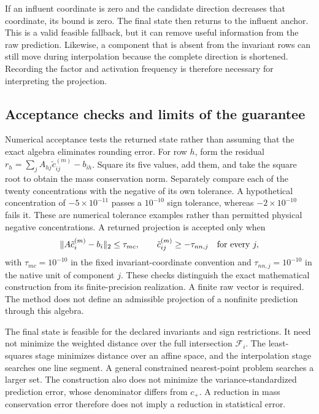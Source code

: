 If an influent coordinate is zero and the candidate direction decreases that coordinate, its bound is zero. The final state then returns to the influent anchor. This is a valid feasible fallback, but it can remove useful information from the raw prediction. Likewise, a component that is absent from the invariant rows can still move during interpolation because the complete direction is shortened. Recording the factor and activation frequency is therefore necessary for interpreting the projection.

\subsection{Acceptance checks and limits of the guarantee}

Numerical acceptance tests the returned state rather than assuming that the exact algebra eliminates rounding error. For row $h$, form the residual $r_h=\sum_jA_{hj}\tilde c_{ij}^{(m)}-b_{ih}$. Square its five values, add them, and take the square root to obtain the mass conservation norm. Separately compare each of the twenty concentrations with the negative of its own tolerance. A hypothetical concentration of $-5\times10^{-11}$ passes a $10^{-10}$ sign tolerance, whereas $-2\times10^{-10}$ fails it. These are numerical tolerance examples rather than permitted physical negative concentrations. A returned projection is accepted only when
\begin{equation}
\equationname{Numerical mass conservation and non-negativity acceptance checks}
\|A\tilde c_i^{(m)}-b_i\|_2\leq\tau_{mc},\qquad
\tilde c_{ij}^{(m)}\geq-\tau_{nn,j}\quad\text{for every }j,
\label{eq:projection_numerical_acceptance}
\end{equation}
with $\tau_{mc}=10^{-10}$ in the fixed invariant-coordinate convention and $\tau_{nn,j}=10^{-10}$ in the native unit of component $j$. These checks distinguish the exact mathematical construction from its finite-precision realization. A finite raw vector is required. The method does not define an admissible projection of a nonfinite prediction through this algebra.

The final state is feasible for the declared invariants and sign restrictions. It need not minimize the weighted distance over the full intersection $\mathcal{F}_i$. The least-squares stage minimizes distance over an affine space, and the interpolation stage searches one line segment. A general constrained nearest-point problem searches a larger set. The construction also does not minimize the variance-standardized prediction error, whose denominator differs from $c_+$. A reduction in mass conservation error therefore does not imply a reduction in statistical error.

